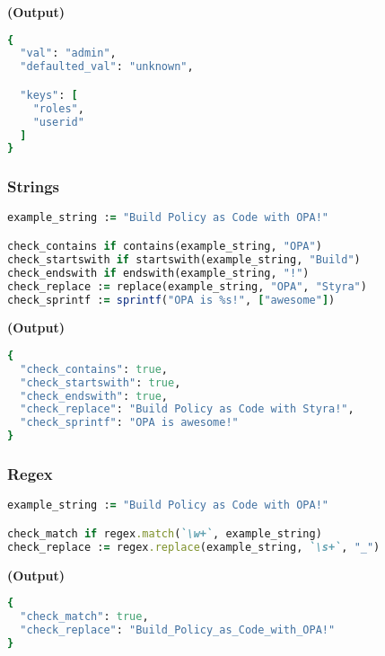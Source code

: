 \documentclass[twocolumn]{article}
\begin{document}
\textbf{\tiny{(Output)}}
\begin{lstlisting}[language=Ruby]
{
  "val": "admin",
  "defaulted_val": "unknown",

  "keys": [
    "roles",
    "userid"
  ]
}
\end{lstlisting}



\vspace{-1em}
\subsubsection*{Strings}

\begin{lstlisting}[language=Ruby]
example_string := "Build Policy as Code with OPA!"

check_contains if contains(example_string, "OPA")
check_startswith if startswith(example_string, "Build")
check_endswith if endswith(example_string, "!")
check_replace := replace(example_string, "OPA", "Styra")
check_sprintf := sprintf("OPA is %s!", ["awesome"])
\end{lstlisting}



\textbf{\tiny{(Output)}}
\begin{lstlisting}[language=Ruby]
{
  "check_contains": true,
  "check_startswith": true,
  "check_endswith": true,
  "check_replace": "Build Policy as Code with Styra!",
  "check_sprintf": "OPA is awesome!"
}
\end{lstlisting}



\vspace{-1em}
\subsubsection*{Regex}

\begin{lstlisting}[language=Ruby]
example_string := "Build Policy as Code with OPA!"

check_match if regex.match(`\w+`, example_string)
check_replace := regex.replace(example_string, `\s+`, "_")
\end{lstlisting}



\textbf{\tiny{(Output)}}
\begin{lstlisting}[language=Ruby]
{
  "check_match": true,
  "check_replace": "Build_Policy_as_Code_with_OPA!"
}
\end{lstlisting}
\end{document}
